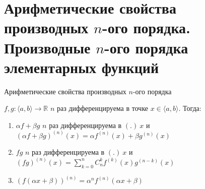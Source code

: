 \section{Арифметические свойства производных $n$-ого порядка. Производные $n$-ого порядка элементарных функций}

\begin{theorem-non}
    Арифметические свойства производных $n$-ого порядка

    $f, g: \langle a,b \rangle \rightarrow \mathbb{R}$ $n$ раз дифференцируема в точке $x \in \langle a,b \rangle$. Тогда:

    \begin{enumerate}
        \item $\alpha f + \beta g$ $n$ раз дифференцируема в $(.) \ x$ и $(\alpha f + \beta g)^{(n)} (x) = \alpha f^{(n)}(x) + \beta g^{(n)}(x)$ 
        \item $fg$ $n$ раз дифференцируема в $(.) \ x$ и $(fg)^{(n)}(x) = \sum\limits_{k=0}^{n} C_n^k f^{(k)}(x) g^{(n-k)} (x)$
        \item $(f(\alpha x + \beta))^{(n)} = \alpha^n f^{(n)}(\alpha x + \beta)$
    \end{enumerate}
\end{theorem-non}

